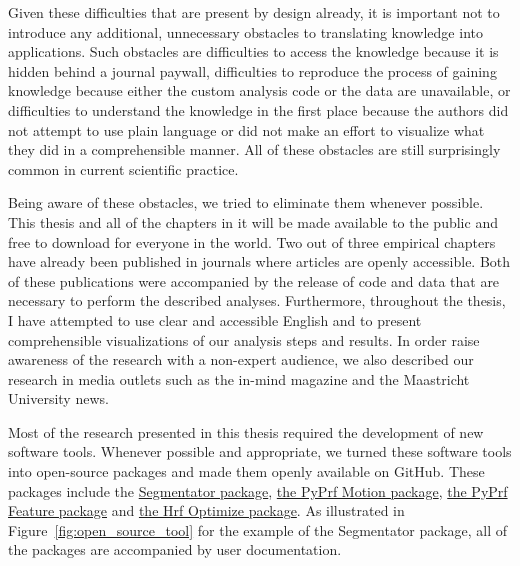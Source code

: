 Given these difficulties that are present by design already, it is important not to introduce any additional, unnecessary obstacles to translating knowledge into applications. Such obstacles are difficulties to access the knowledge because it is hidden behind a journal paywall, difficulties to reproduce the process of gaining knowledge because either the custom analysis code or the data are unavailable, or difficulties to understand the knowledge in the first place because the authors did not attempt to use plain language or did not make an effort to visualize what they did in a comprehensible manner. All of these obstacles are still surprisingly common in current scientific practice.

Being aware of these obstacles, we tried to eliminate them whenever possible. This thesis and all of the chapters in it will be made available to the public and free to download for everyone in the world. Two out of three empirical chapters have already been published in journals where articles are openly accessible. Both of these publications were accompanied by the release of code and data that are necessary to perform the described analyses. Furthermore, throughout the thesis, I have attempted to use clear and accessible English and to present comprehensible visualizations of our analysis steps and results. In order raise awareness of the research with a non-expert audience, we also described our research in media outlets such as the in-mind magazine and the Maastricht University news. 

Most of the research presented in this thesis required the development of new software tools. Whenever possible and appropriate, we turned these software tools into open-source packages and made them openly available on GitHub. These packages include the \href{https://github.com/ofgulban/segmentator}{Segmentator package}, \href{https://github.com/MSchnei/pyprf_motion}{the PyPrf Motion package}, \href{https://github.com/MSchnei/pyprf_feature}{the PyPrf Feature package} and \href{https://github.com/MSchnei/hrf_opt}{the Hrf Optimize package}. As illustrated in Figure~\ref{fig:open_source_tool} for the example of the Segmentator package, all of the packages are accompanied by user documentation.

